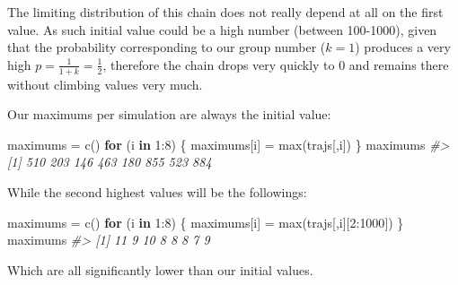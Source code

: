 \documentclass[
]{article}
\newenvironment{Shaded}{\begin{snugshade}}{\end{snugshade}}
\newcommand{\CommentTok}[1]{\textcolor[rgb]{0.56,0.35,0.01}{\textit{#1}}}
\newcommand{\ControlFlowTok}[1]{\textcolor[rgb]{0.13,0.29,0.53}{\textbf{#1}}}
\newcommand{\DecValTok}[1]{\textcolor[rgb]{0.00,0.00,0.81}{#1}}
\newcommand{\FunctionTok}[1]{\textcolor[rgb]{0.00,0.00,0.00}{#1}}
\newcommand{\NormalTok}[1]{#1}
\newcommand{\OtherTok}[1]{\textcolor[rgb]{0.56,0.35,0.01}{#1}}
\newcommand{\SpecialCharTok}[1]{\textcolor[rgb]{0.00,0.00,0.00}{#1}}
\begin{document}
The limiting distribution of this chain does not really depend at all on
the first value. As such initial value could be a high number (between
100-1000), given that the probability corresponding to our group number
(\(k=1\)) produces a very high \(p=\frac{1}{1+k} = \frac{1}{2}\),
therefore the chain drops very quickly to 0 and remains there without
climbing values very much.

Our maximums per simulation are always the initial value:

\begin{Shaded}
\begin{Highlighting}[]
\NormalTok{maximums }\OtherTok{=} \FunctionTok{c}\NormalTok{()}
\ControlFlowTok{for}\NormalTok{ (i }\ControlFlowTok{in} \DecValTok{1}\SpecialCharTok{:}\DecValTok{8}\NormalTok{) \{}
\NormalTok{    maximums[i] }\OtherTok{=} \FunctionTok{max}\NormalTok{(trajs[,i])}
\NormalTok{\}}
\NormalTok{maximums}
\CommentTok{\#\textgreater{} [1] 510 203 146 463 180 855 523 884}
\end{Highlighting}
\end{Shaded}

While the second highest values will be the followings:

\begin{Shaded}
\begin{Highlighting}[]
\NormalTok{maximums }\OtherTok{=} \FunctionTok{c}\NormalTok{()}
\ControlFlowTok{for}\NormalTok{ (i }\ControlFlowTok{in} \DecValTok{1}\SpecialCharTok{:}\DecValTok{8}\NormalTok{) \{}
\NormalTok{    maximums[i] }\OtherTok{=} \FunctionTok{max}\NormalTok{(trajs[,i][}\DecValTok{2}\SpecialCharTok{:}\DecValTok{1000}\NormalTok{])}
\NormalTok{\}}
\NormalTok{maximums}
\CommentTok{\#\textgreater{} [1] 11  9 10  8  8  8  7  9}
\end{Highlighting}
\end{Shaded}

Which are all significantly lower than our initial values.
\end{document}
